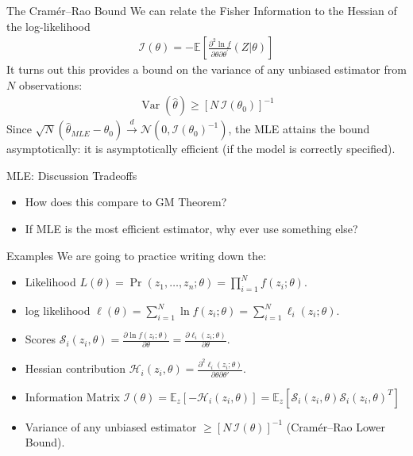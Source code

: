 \documentclass[aspectratio=169,11pt]{beamer}
\begin{document}
\begin{frame}{The Cram\'er--Rao Bound}
We can relate the \alert{Fisher Information} to the Hessian of the log-likelihood
\begin{align*}
\mathcal { I } ( \theta ) = - \mathbb { E } \left[ \frac { \partial ^ { 2 } \ln f } { \partial \theta \partial \theta ^ { \prime } } ( Z | \theta ) \right]
\end{align*}
It turns out this provides a bound on the variance of any \alert{unbiased} estimator from $N$ observations:
\begin{align*}
\operatorname { Var } ( \hat { \theta } ) \geq \left[ N \, \mathcal { I } \left( \theta _ { 0 } \right) \right] ^ { - 1 }
\end{align*}
Since $\sqrt{N}(\widehat{\theta}_{MLE}-\theta_0) \stackrel{d}{\longrightarrow} \mathcal{N}(0,\mathcal{I}(\theta_0)^{-1})$, the MLE attains the bound asymptotically: it is \alert{asymptotically efficient} (if the model is correctly specified).
\end{frame}

\begin{frame}{MLE: Discussion}
Tradeoffs
\begin{itemize}
\item How does this compare to GM Theorem?
\item If MLE is the most efficient estimator, why ever use something else?
\end{itemize}
\end{frame}



\begin{frame}{Examples}
We are going to practice writing down the:
\begin{itemize}
\item Likelihood $L(\theta)= \Pr(z_1,\ldots,z_n ; \theta) = \prod_{i=1}^N f(z_i ; \theta)$.
\item log likelihood $\ell(\theta)= \sum_{i=1}^N \ln f(z_i ; \theta) = \sum_{i=1}^N \ell_i(z_i ; \theta)$.
\item Scores $\mathcal{S}_i(z_i, \theta) =\frac{\partial \ln f(z_i ; \theta)}{\partial \theta}=\frac{\partial \ell_i(z_i ; \theta)}{\partial \theta}$.
\item Hessian contribution $\mathcal{H}_i(z_i, \theta) =\frac{\partial^2 \ell_i(z_i ; \theta)}{\partial \theta \partial \theta'}$.
\item Information Matrix $\mathcal{I}(\theta) = \mathbb{E}_z[-\mathcal{H}_i(z_i,\theta)]=\mathbb{E}_z[\mathcal{S}_i(z_i,\theta) \mathcal{S}_i(z_i,\theta)^T]$
\item Variance of any unbiased estimator $\geq [N\,\mathcal{I}(\theta)]^{-1} $ (Cram\'er--Rao Lower Bound).
\end{itemize}

\end{frame}
\end{document}
